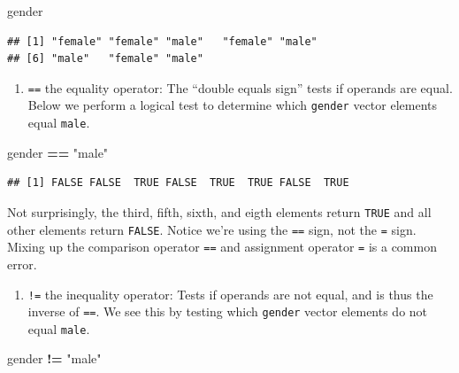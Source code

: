 \documentclass[
]{krantz}
\newenvironment{Shaded}{\begin{snugshade}}{\end{snugshade}}
\newcommand{\NormalTok}[1]{#1}
\newcommand{\OperatorTok}[1]{\textcolor[rgb]{0.81,0.36,0.00}{\textbf{#1}}}
\newcommand{\StringTok}[1]{\textcolor[rgb]{0.31,0.60,0.02}{#1}}
\providecommand{\tightlist}{%
  \setlength{\itemsep}{0pt}\setlength{\parskip}{0pt}}
\begin{document}
\begin{Shaded}
\begin{Highlighting}[]
\NormalTok{gender}
\end{Highlighting}
\end{Shaded}

\begin{verbatim}
## [1] "female" "female" "male"   "female" "male"  
## [6] "male"   "female" "male"
\end{verbatim}

\begin{enumerate}
\def\labelenumi{\arabic{enumi}.}
\tightlist
\item
  \texttt{==} the equality operator: The ``double equals sign'' tests if operands are equal. Below we perform a logical test to determine which \texttt{gender} vector elements equal \texttt{male}.
\end{enumerate}

\begin{Shaded}
\begin{Highlighting}[]
\NormalTok{gender }\OperatorTok{==}\StringTok{ "male"}
\end{Highlighting}
\end{Shaded}

\begin{verbatim}
## [1] FALSE FALSE  TRUE FALSE  TRUE  TRUE FALSE  TRUE
\end{verbatim}

Not surprisingly, the third, fifth, sixth, and eigth elements return \texttt{TRUE} and all other elements return \texttt{FALSE}. Notice we're using the \texttt{==} sign, not the \texttt{=} sign. Mixing up the comparison operator \texttt{==} and assignment operator \texttt{=} is a common error.

\begin{enumerate}
\def\labelenumi{\arabic{enumi}.}
\setcounter{enumi}{1}
\tightlist
\item
  \texttt{!=} the inequality operator: Tests if operands are not equal, and is thus the inverse of \texttt{==}. We see this by testing which \texttt{gender} vector elements do not equal \texttt{male}.
\end{enumerate}

\begin{Shaded}
\begin{Highlighting}[]
\NormalTok{gender }\OperatorTok{!=}\StringTok{ "male"}
\end{Highlighting}
\end{Shaded}
\end{document}
